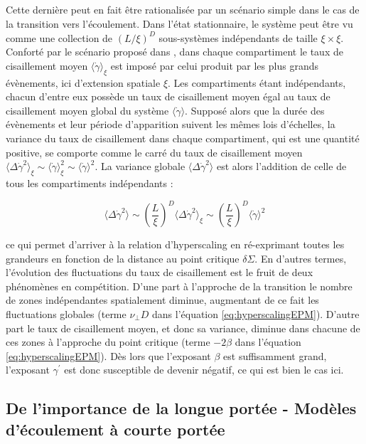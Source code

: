 \subparagraph{}Cette dernière peut en fait être rationalisée par un scénario simple dans le cas de la transition vers l'écoulement. Dans l'état stationnaire, le système peut être vu comme une collection de $(L/\xi)^D$ sous-systèmes indépendants de taille $\xi \times \xi$. Conforté par le scénario proposé dans \cite{lin_scaling_2014}, dans chaque compartiment le taux de cisaillement moyen $\langle\dot{\gamma}\rangle_\xi$ est imposé par celui produit par les plus grands évènements, ici d'extension spatiale $\xi$. Les compartiments étant indépendants, chacun d'entre eux possède un taux de cisaillement moyen égal au taux de cisaillement moyen global du système $\langle \dot{\gamma} \rangle$. Supposé alors que la durée des évènements et leur période d'apparition suivent les mêmes lois d'échelles, la variance du taux de cisaillement dans chaque compartiment, qui est une quantité positive, se comporte comme le carré du taux de cisaillement moyen $\langle \Delta\dot{\gamma}^2 \rangle_\xi \sim \langle\dot{\gamma}\rangle_\xi^2 \sim \langle\dot{\gamma}\rangle^2$. La variance globale $\langle \Delta\dot{\gamma}^2 \rangle$ est alors l'addition de celle de tous les compartiments indépendants :

\begin{equation}
	\langle \Delta\dot{\gamma}^2 \rangle \sim \left(\frac{L}{\xi}\right)^D\langle \Delta\dot{\gamma}^2 \rangle_\xi \sim \left(\frac{L}{\xi}\right)^D\langle \dot{\gamma} \rangle^2
\end{equation}

\noindent ce qui permet d'arriver à la relation d'hyperscaling en ré-exprimant toutes les grandeurs en fonction de la distance au point critique $\delta\Sigma$. En d'autres termes, l'évolution des fluctuations du taux de cisaillement est le fruit de deux phénomènes en compétition. D'une part à l'approche de la transition le nombre de zones indépendantes spatialement diminue, augmentant de ce fait les fluctuations globales (terme $\nu_\perp D$ dans l'équation \autoref{eq:hyperscalingEPM}). D'autre part le taux de cisaillement moyen, et donc sa variance, diminue dans chacune de ces zones à l'approche du point critique (terme $-2\beta$ dans l'équation \autoref{eq:hyperscalingEPM}). Dès lors que l'exposant $\beta$ est suffisamment grand, l'exposant $\gamma^\prime$ est donc susceptible de devenir négatif, ce qui est bien le cas ici.

\subsection{De l'importance de la longue portée - Modèles d'écoulement à courte portée}


